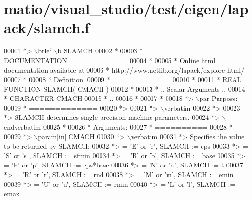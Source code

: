 \hypertarget{matio_2visual__studio_2test_2eigen_2lapack_2slamch_8f_source}{}\section{matio/visual\+\_\+studio/test/eigen/lapack/slamch.f}
\label{matio_2visual__studio_2test_2eigen_2lapack_2slamch_8f_source}

\begin{DoxyCode}
00001 \textcolor{comment}{*> \(\backslash\)brief \(\backslash\)b SLAMCH}
00002 \textcolor{comment}{*}
00003 \textcolor{comment}{*  =========== DOCUMENTATION ===========}
00004 \textcolor{comment}{*}
00005 \textcolor{comment}{* Online html documentation available at }
00006 \textcolor{comment}{*            http://www.netlib.org/lapack/explore-html/ }
00007 \textcolor{comment}{*}
00008 \textcolor{comment}{*  Definition:}
00009 \textcolor{comment}{*  ===========}
00010 \textcolor{comment}{*}
00011 \textcolor{comment}{*      REAL             FUNCTION SLAMCH( CMACH )}
00012 \textcolor{comment}{*}
00013 \textcolor{comment}{*     .. Scalar Arguments ..}
00014 \textcolor{comment}{*      CHARACTER          CMACH}
00015 \textcolor{comment}{*     ..}
00016 \textcolor{comment}{*  }
00017 \textcolor{comment}{*}
00018 \textcolor{comment}{*> \(\backslash\)par Purpose:}
00019 \textcolor{comment}{*  =============}
00020 \textcolor{comment}{*>}
00021 \textcolor{comment}{*> \(\backslash\)verbatim}
00022 \textcolor{comment}{*>}
00023 \textcolor{comment}{*> SLAMCH determines single precision machine parameters.}
00024 \textcolor{comment}{*> \(\backslash\)endverbatim}
00025 \textcolor{comment}{*}
00026 \textcolor{comment}{*  Arguments:}
00027 \textcolor{comment}{*  ==========}
00028 \textcolor{comment}{*}
00029 \textcolor{comment}{*> \(\backslash\)param[in] CMACH}
00030 \textcolor{comment}{*> \(\backslash\)verbatim}
00031 \textcolor{comment}{*>          Specifies the value to be returned by SLAMCH:}
00032 \textcolor{comment}{*>          = 'E' or 'e',   SLAMCH := eps}
00033 \textcolor{comment}{*>          = 'S' or 's ,   SLAMCH := sfmin}
00034 \textcolor{comment}{*>          = 'B' or 'b',   SLAMCH := base}
00035 \textcolor{comment}{*>          = 'P' or 'p',   SLAMCH := eps*base}
00036 \textcolor{comment}{*>          = 'N' or 'n',   SLAMCH := t}
00037 \textcolor{comment}{*>          = 'R' or 'r',   SLAMCH := rnd}
00038 \textcolor{comment}{*>          = 'M' or 'm',   SLAMCH := emin}
00039 \textcolor{comment}{*>          = 'U' or 'u',   SLAMCH := rmin}
00040 \textcolor{comment}{*>          = 'L' or 'l',   SLAMCH := emax}

\end{DoxyCode}
